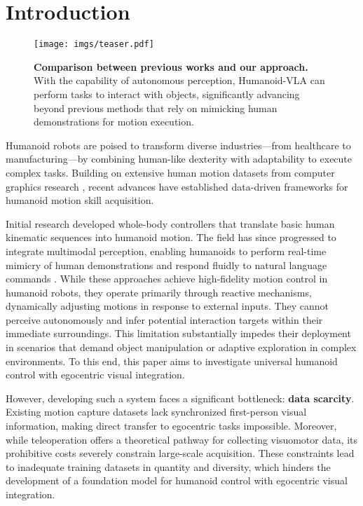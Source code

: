 \section{Introduction}


\begin{figure}
  \centering
   \texttt{[image: imgs/teaser.pdf]}
   \caption{\textbf{Comparison between previous works and our approach.} With the capability of autonomous perception, Humanoid-VLA can perform tasks to interact with objects, significantly advancing beyond previous methods that rely on mimicking human demonstrations for motion execution.}
   \label{fig:teaser}
\end{figure}

Humanoid robots are poised to transform diverse industries—from healthcare to manufacturing—by combining human-like dexterity with adaptability to execute complex tasks. Building on extensive human motion datasets from computer graphics research \cite{mahmood2019amass,guo2020action2motion}, recent advances have established data-driven frameworks for humanoid motion skill acquisition. 

Initial research \cite{cheng2024expressive,ji2024exbody2} developed whole-body controllers that translate basic human kinematic sequences into humanoid motion. The field has since progressed to integrate multimodal perception, enabling humanoids to perform real-time mimicry of human demonstrations \cite{he2024learning} and respond fluidly to natural language commands \cite{mao2024learning}. 
While these approaches achieve high-fidelity motion control in humanoid robots, they operate primarily through reactive mechanisms, dynamically adjusting motions in response to external inputs. They cannot perceive autonomously and infer potential interaction targets within their immediate surroundings. This limitation substantially impedes their deployment in scenarios that demand object manipulation or adaptive exploration in complex environments.
To this end, this paper aims to investigate universal humanoid control with egocentric visual integration. 

However, developing such a system faces a significant bottleneck: \textbf{data scarcity}.
Existing motion capture datasets lack synchronized first-person visual information, making direct transfer to egocentric tasks impossible. Moreover, while teleoperation offers a theoretical pathway for collecting visuomotor data, its prohibitive costs severely constrain large-scale acquisition. These constraints lead to inadequate training datasets in quantity and diversity, which hinders the development of a foundation model for humanoid control with egocentric visual integration. 

